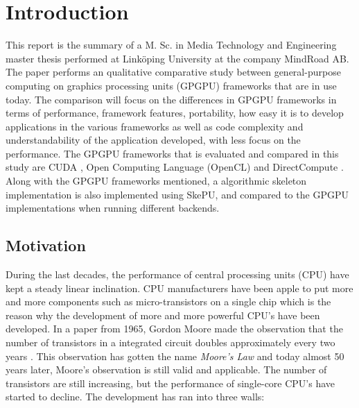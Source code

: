 
\chapter{Introduction}  %
This report is the summary of a M. Sc. in Media Technology and Engineering master thesis performed at Linköping University at the company MindRoad AB. The paper performs an qualitative comparative study between general-purpose computing on graphics processing units (GPGPU) frameworks that are in use today. The comparison will focus on the differences in GPGPU frameworks in terms of performance, framework features, portability, how easy it is to develop applications in the various frameworks as well as code complexity and understandability of the application developed, with less focus on the performance. The GPGPU frameworks that is evaluated and compared in this study are CUDA \cite{AboutCuda}, Open Computing Language (OpenCL) \cite{KhronosOpenCL} and DirectCompute \cite{NVidiaDirectCompute}. Along with the GPGPU frameworks mentioned, a algorithmic skeleton implementation is also implemented using SkePU, and compared to the GPGPU implementations when running different backends.


\section{Motivation} \label{sec:IntroductionMotivation}
During the last decades, the performance of central processing units (CPU) have kept a steady linear inclination. CPU manufacturers have been apple to put more and more components such as micro-transistors on a single chip which is the reason why the development of more and more powerful CPU's have been developed. In a paper from 1965, Gordon Moore made the observation that the number of transistors in a integrated circuit doubles approximately every two years \cite{MooresLaw}. This observation has gotten the name \textit{Moore's Law} and today almost 50 years later, Moore's observation is still valid and applicable. The number of transistors are still increasing, but the performance of single-core CPU's have started to decline. The development has ran into three walls:

